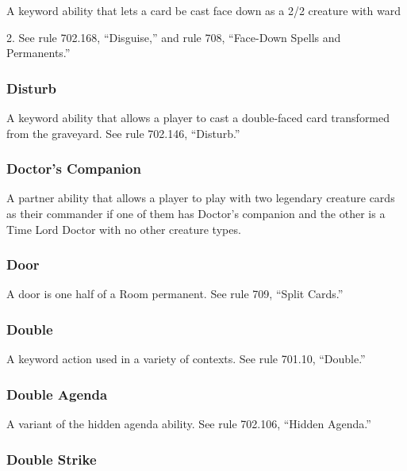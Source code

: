 {{{{{{A keyword ability that lets a card be cast face down as a 2/2 creature with ward {2. See rule 702.168, “Disguise,” and rule 708, “Face-Down Spells and Permanents.”

\subsubsection*{Disturb}

A keyword ability that allows a player to cast a double-faced card transformed from the graveyard. See rule 702.146, “Disturb.”

\subsubsection*{Doctor’s Companion}

A partner ability that allows a player to play with two legendary creature cards as their commander if one of them has Doctor’s companion and the other is a Time Lord Doctor with no other creature types.

\subsubsection*{Door}

A door is one half of a Room permanent. See rule 709, “Split Cards.”

\subsubsection*{Double}

A keyword action used in a variety of contexts. See rule 701.10, “Double.”

\subsubsection*{Double Agenda}

A variant of the hidden agenda ability. See rule 702.106, “Hidden Agenda.”

\subsubsection*{Double Strike}

}}}}}}}
